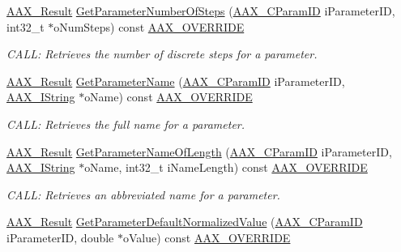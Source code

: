 \begin{Indent}
\begin{DoxyCompactItemize}
\mbox{\hyperlink{a00392_a4d8f69a697df7f70c3a8e9b8ee130d2f}{A\+A\+X\+\_\+\+Result}} \mbox{\hyperlink{a01481_a3a142f7b8bd3e09b522445c0b315c759}{Get\+Parameter\+Number\+Of\+Steps}} (\mbox{\hyperlink{a00392_a1440c756fe5cb158b78193b2fc1780d1}{A\+A\+X\+\_\+\+C\+Param\+ID}} i\+Parameter\+ID, int32\+\_\+t $\ast$o\+Num\+Steps) const \mbox{\hyperlink{a00392_ac2f24a5172689ae684344abdcce55463}{A\+A\+X\+\_\+\+O\+V\+E\+R\+R\+I\+DE}}
\begin{DoxyCompactList}\small\item\em C\+A\+LL\+: Retrieves the number of discrete steps for a parameter. \end{DoxyCompactList}\item 
\mbox{\hyperlink{a00392_a4d8f69a697df7f70c3a8e9b8ee130d2f}{A\+A\+X\+\_\+\+Result}} \mbox{\hyperlink{a01481_af618b324cdd013ffa322f798af30ca40}{Get\+Parameter\+Name}} (\mbox{\hyperlink{a00392_a1440c756fe5cb158b78193b2fc1780d1}{A\+A\+X\+\_\+\+C\+Param\+ID}} i\+Parameter\+ID, \mbox{\hyperlink{a01873}{A\+A\+X\+\_\+\+I\+String}} $\ast$o\+Name) const \mbox{\hyperlink{a00392_ac2f24a5172689ae684344abdcce55463}{A\+A\+X\+\_\+\+O\+V\+E\+R\+R\+I\+DE}}
\begin{DoxyCompactList}\small\item\em C\+A\+LL\+: Retrieves the full name for a parameter. \end{DoxyCompactList}\item 
\mbox{\hyperlink{a00392_a4d8f69a697df7f70c3a8e9b8ee130d2f}{A\+A\+X\+\_\+\+Result}} \mbox{\hyperlink{a01481_af0bc3d6fb8f387f58a073f8902233bd3}{Get\+Parameter\+Name\+Of\+Length}} (\mbox{\hyperlink{a00392_a1440c756fe5cb158b78193b2fc1780d1}{A\+A\+X\+\_\+\+C\+Param\+ID}} i\+Parameter\+ID, \mbox{\hyperlink{a01873}{A\+A\+X\+\_\+\+I\+String}} $\ast$o\+Name, int32\+\_\+t i\+Name\+Length) const \mbox{\hyperlink{a00392_ac2f24a5172689ae684344abdcce55463}{A\+A\+X\+\_\+\+O\+V\+E\+R\+R\+I\+DE}}
\begin{DoxyCompactList}\small\item\em C\+A\+LL\+: Retrieves an abbreviated name for a parameter. \end{DoxyCompactList}\item 
\mbox{\hyperlink{a00392_a4d8f69a697df7f70c3a8e9b8ee130d2f}{A\+A\+X\+\_\+\+Result}} \mbox{\hyperlink{a01481_ae92a568c56bfff70eb4622c48db85bc0}{Get\+Parameter\+Default\+Normalized\+Value}} (\mbox{\hyperlink{a00392_a1440c756fe5cb158b78193b2fc1780d1}{A\+A\+X\+\_\+\+C\+Param\+ID}} i\+Parameter\+ID, double $\ast$o\+Value) const \mbox{\hyperlink{a00392_ac2f24a5172689ae684344abdcce55463}{A\+A\+X\+\_\+\+O\+V\+E\+R\+R\+I\+DE}}

\end{DoxyCompactItemize}
\end{Indent}
